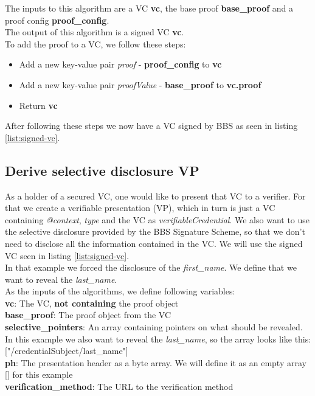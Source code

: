 \documentclass[
	a4paper               %
	,BCOR=0mm            %
	,bibliography=totoc   %
	,listof=totoc         %
	,monolingual
	,twoside=false
]{bfhthesis}              %
\begin{document}
The inputs to this algorithm are a VC \textbf{vc}, the base proof \textbf{base\_proof} and a proof config \textbf{proof\_config}.\\

The output of this algorithm is a signed VC \textbf{vc}.\\

To add the proof to a VC, we follow these steps:
\begin{itemize}
	\item Add a new key-value pair \textit{proof} - \textbf{proof\_config} to \textbf{vc}
	\item Add a new key-value pair \textit{proofValue} - \textbf{base\_proof} to \textbf{vc.proof}
	\item Return \textbf{vc}
\end{itemize}

After following these steps we now have a VC signed by BBS as seen in listing \ref{list:signed-vc}.

\subsection{Derive selective disclosure VP}
As a holder of a secured VC, one would like to present that VC to a verifier.
For that we create a verifiable presentation (VP), which in turn is just a VC containing \textit{@context}, \textit{type} and the VC as \textit{verifiableCredential}.
We also want to use the selective disclosure provided by the BBS Signature Scheme, so that we don't need to disclose all the information contained in the VC.
We will use the signed VC seen in listing \ref{list:signed-vc}.\\
In that example we forced the disclosure of the \textit{first\_name}.
We define that we want to reveal the \textit{last\_name}.\\

As the inputs of the algorithms, we define following variables:\\
\textbf{vc}: The VC, \textbf{not containing} the proof object\\
\textbf{base\_proof}: The proof object from the VC\\
\textbf{selective\_pointers}: An array containing pointers on what should be revealed. In this example we also want to reveal the \textit{last\_name}, so the array looks like this: ["/credentialSubject/last\_name"]\\
\textbf{ph}: The presentation header as a byte array. We will define it as an empty array [] for this example\\
\textbf{verification\_method}: The URL to the verification method\\
\end{document}

